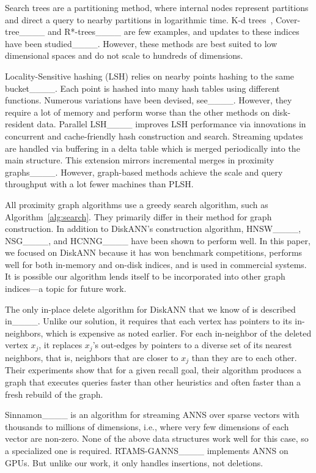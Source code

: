 Search trees are a partitioning method, where internal nodes
represent partitions and direct a query to nearby
partitions in logarithmic time.
K-d trees~, Cover-tree____ and R*-trees____ 
are few examples, and updates to these indices have been  studied____.
However, these methods are best suited to low dimensional spaces
and do not scale to hundreds of dimensions.

Locality-Sensitive hashing (LSH) relies on nearby points hashing to the same bucket____.
Each point is hashed into many hash tables using different functions.
Numerous variations have been devised, see____.
However, they require a lot of memory and perform worse than the other methods on disk-resident data.
Parallel LSH____ improves LSH performance via innovations in
concurrent and cache-friendly hash construction and search. 
Streaming updates are handled via buffering in a delta table
which is merged periodically into the main structure.
This extension mirrors incremental merges in proximity graphs____.
However, graph-based methods achieve the scale and query throughput with a lot fewer machines than PLSH.



All proximity graph algorithms use a greedy search algorithm, such as Algorithm~\ref{alg:search}.
They primarily differ in their method for graph construction.
In addition to DiskANN's construction algorithm, HNSW____, NSG____, and HCNNG____ have been shown to perform well. 
In this paper, we focused on DiskANN because it has won benchmark competitions,
performs well for both in-memory and on-disk indices, and is used in commercial systems.
It is possible our algorithm lends itself to be incorporated into other graph indices---a topic for future work.

The only in-place delete algorithm for DiskANN that we know of is described in____.
Unlike our solution, it requires that each vertex has pointers to its in-neighbors, which is expensive as noted earlier.
For each in-neighbor of the deleted vertex $x_j$, it replaces $x_j$'s out-edges by pointers to a diverse set of its nearest neighbors, that is, neighbors that are closer to $x_j$ than they are to each other.
Their experiments show that for a given recall goal, their algorithm produces a graph that executes queries faster than other heuristics and often faster than a fresh rebuild of the graph.

Sinnamon____ is an algorithm for streaming ANNS over sparse vectors with thousands to millions of dimensions, i.e., where very few dimensions of each vector are non-zero.
None of the above data structures work well for this case, so a specialized one is required.
RTAMS-GANNS____ implements ANNS on GPUs.
But unlike our work, it only handles insertions, not deletions.